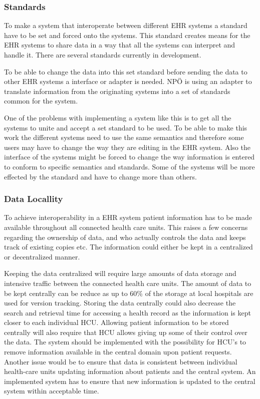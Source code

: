 \documentclass[14pt]{article}
\begin{document}
\subsubsection{Standards}
To make a system that interoperate between different \gls{EHR} systems a standard have to be set and forced onto the systems. This standard creates means for the \gls{EHR} systems to share data in a way that all the systems can interpret and handle it. There are several standards currently in development.

To be able to change the data into this set standard before sending the data to other \gls{EHR} systems a interface or adapter is needed. NPÖ is using an adapter to translate information from the originating systems into a set of standards common for the system. 

One of the problems with implementing a system like this is to get all the systems to unite and accept a set standard to be used. To be able to make this work the different systems need to use the same semantics and therefore some users may have to change the way they are editing in the \gls{EHR} system. Also the interface of the systems might be forced to change the way information is entered to conform to specific semantics and standards. Some of the systems will be more effected by the standard and have to change more than others. 

\subsubsection{Data Locallity}
To achieve interoperability in a \gls{EHR} system patient information has to be made available throughout all connected health care units. This raises a few concerns regarding the ownership of data, and who actually controls the data and keeps track of existing copies etc. The information could either be kept in a centralized or decentralized manner.

Keeping the data centralized will require large amounts of data storage and intensive traffic between the connected health care units. The amount of data to be kept centrally can be reduce as up to 60\% of the storage at local hospitals are used for version tracking. Storing the data centrally could also decrease the search and retrieval time for accessing a health record as the information is kept closer to each individual HCU.
Allowing patient information to be stored centrally will also require that HCU allows giving up some of their control over the data. The system should be implemented with the possibility for HCU’s to remove information available in the central domain upon patient requests. Another issue would be to ensure that data is consistent between individual health-care units updating information about patients and the central system. An implemented system has to ensure that new information is updated to the central system within acceptable time.
\end{document}
